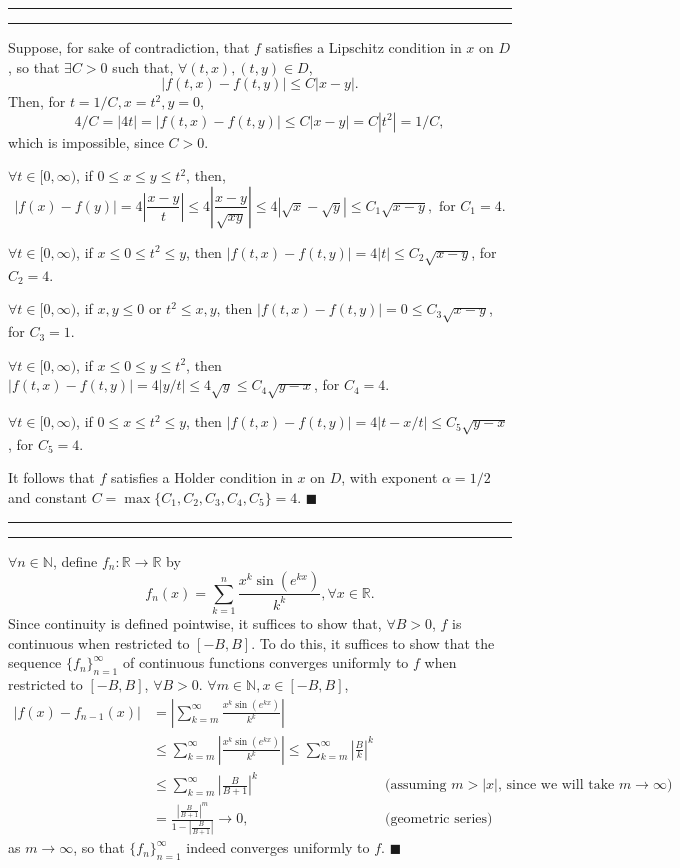\documentclass[11pt]{article}
\newcounter{questionCounter}
\newcounter{partCounter}[questionCounter]
\newenvironment{question}[2][\arabic{questionCounter}]{%
    \setcounter{partCounter}{0}%
    \vspace{.25in} \hrule \vspace{0.5em}%
        \noindent{\bf #2}%
    \vspace{0.8em} \hrule \vspace{.10in}%
    \addtocounter{questionCounter}{1}%
}{}
\renewcommand{\qed}{\quad $\blacksquare$}
\newcommand{\N}{\mathbb{N}} %
\newcommand{\R}{\mathbb{R}} %
\begin{document}
\begin{question}{Problem 4}
Suppose, for sake of contradiction, that $f$ satisfies a Lipschitz condition in
$x$ on $D$, so that $\exists C > 0$ such that, $\forall (t,x),(t,y) \in D$,
\[|f(t,x) - f(t,y)| \leq C|x - y|.\]
Then, for $t = 1/C, x = t^2, y = 0$,
\[4/C = |4t| = |f(t,x) - f(t,y)| \leq C|x - y| = C|t^2| = 1/C,\]
which is impossible, since $C > 0$.

$\forall t \in [0,\infty)$, if $0 \leq x \leq y \leq t^2$, then,
\[|f(x) - f(y)|
 = 4\left|\frac{x - y}{t}\right|
 \leq 4\left|\frac{x - y}{\sqrt{xy}}\right|
 \leq 4\left|\sqrt{x} - \sqrt{y}\right|
 \leq C_1\sqrt{x - y}, \mbox{ for $C_1 = 4$.}
\]

$\forall t \in [0,\infty)$, if $x \leq 0 \leq t^2 \leq y$, then
$|f(t,x) - f(t,y)| = 4|t| \leq C_2\sqrt{x - y}$, for $C_2 = 4$.

$\forall t \in [0,\infty)$, if $x, y \leq 0$ or $t^2 \leq x, y$, then
$|f(t,x) - f(t,y)| = 0 \leq C_3\sqrt{x - y}$, for $C_3 = 1$.

$\forall t \in [0,\infty)$, if $x \leq 0 \leq y \leq t^2$, then
$|f(t,x) - f(t,y)| = 4|y/t| \leq 4\sqrt{y} \leq C_4\sqrt{y - x}$, for $C_4 = 4$.

$\forall t \in [0,\infty)$, if $0 \leq x \leq t^2 \leq y$, then
$|f(t,x) - f(t,y)| = 4|t - x/t| \leq C_5\sqrt{y - x}$, for $C_5 = 4$.

It follows that $f$ satisfies a Holder condition in $x$ on $D$, with exponent
$\alpha = 1/2$ and constant $C = \max\{C_1,C_2,C_3,C_4, C_5\} = 4$.
\qed
\end{question}

\newpage
\begin{question}{Problem 5}
$\forall n \in \N$, define $f_n : \R \rightarrow \R$ by
\[f_n(x)
  = \sum_{k = 1}^{n} \frac{x^k\sin(e^{kx})}{k^k},
  \forall x \in \R.
\]
Since continuity is defined pointwise, it suffices to show that, $\forall B >
0$, $f$ is continuous when restricted to $[-B,B]$. To do this, it suffices to
show that the sequence $\{f_n\}_{n = 1}^{\infty}$ of continuous functions
converges uniformly to $f$ when restricted to $[-B,B]$, $\forall B > 0$.
$\forall m \in \N, x \in [-B,B]$,
\begin{align*}
|f(x) - f_{n - 1}(x)|
 & = \left| \sum_{k = m}^{\infty} \frac{x^k\sin(e^{kx})}{k^k} \right| \\
 & \leq \sum_{k = m}^{\infty} \left| \frac{x^k\sin(e^{kx})}{k^k} \right|
   \leq \sum_{k = m}^{\infty} \left| \frac{B}{k} \right|^k \\
 & \leq \sum_{k = m}^{\infty} \left| \frac{B}{B + 1} \right|^k
 & \mbox{(assuming $m > |x|$, since we will take $m \rightarrow \infty$)} \\
 & =    \frac{    \left| \frac{B}{B + 1} \right|^m}
             {1 - \left| \frac{B}{B + 1} \right|}
   \rightarrow 0,
 & \mbox{(geometric series)}
\end{align*}
as $m \rightarrow \infty$, so that $\{f_n\}_{n = 1}^{\infty}$ indeed converges
uniformly to $f$. \qed
\end{question}
\end{document}
